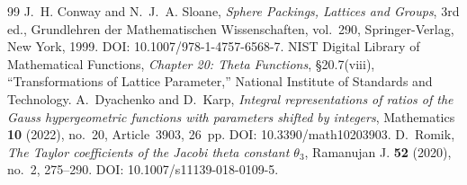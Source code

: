 \documentclass[10pt,a4paper]{amsart}
\numberwithin{equation}{section}
\begin{document}
\begin{thebibliography}{99}
 J.~H. Conway and N.~J.~A. Sloane, \emph{Sphere Packings, Lattices and Groups}, 3rd ed., Grundlehren der Mathematischen Wissenschaften, vol.~290, Springer-Verlag, New York, 1999. DOI: 10.1007/978-1-4757-6568-7.
 NIST Digital Library of Mathematical Functions, \emph{Chapter 20: Theta Functions}, \S20.7(viii), ``Transformations of Lattice Parameter,'' National Institute of Standards and Technology.
 A.~Dyachenko and D.~Karp, \emph{Integral representations of ratios of the Gauss hypergeometric functions with parameters shifted by integers}, Mathematics \textbf{10} (2022), no.~20, Article~3903, 26~pp. DOI: 10.3390/math10203903.
 D.~Romik, \emph{The Taylor coefficients of the Jacobi theta constant $\theta_3$}, Ramanujan J. \textbf{52} (2020), no.~2, 275--290. DOI: 10.1007/s11139-018-0109-5.
\end{thebibliography}
\end{document}
